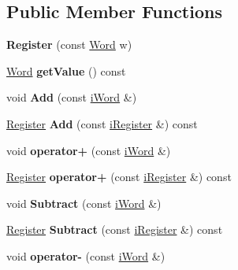 \subsection*{Public Member Functions}
\begin{DoxyCompactItemize}
\item 
\hypertarget{classRegister_a6aea43b4c4ad669073f20fbcd274b49c}{
{\bfseries Register} (const \hyperlink{classWord}{Word} w)}
\label{classRegister_a6aea43b4c4ad669073f20fbcd274b49c}

\item 
\hypertarget{classRegister_a38a40476d54b5614138d1adac61ac1b0}{
\hyperlink{classWord}{Word} {\bfseries getValue} () const }
\label{classRegister_a38a40476d54b5614138d1adac61ac1b0}

\item 
\hypertarget{classRegister_a0dd8ed2fdfff423b6f545f8ed5640416}{
void {\bfseries Add} (const \hyperlink{classiWord}{iWord} \&)}
\label{classRegister_a0dd8ed2fdfff423b6f545f8ed5640416}

\item 
\hypertarget{classRegister_ae77a60fdd812c0c714079d23f6413e32}{
\hyperlink{classRegister}{Register} {\bfseries Add} (const \hyperlink{classiRegister}{iRegister} \&) const }
\label{classRegister_ae77a60fdd812c0c714079d23f6413e32}

\item 
\hypertarget{classRegister_abc659fbe3ff01c1699397e955b855538}{
void {\bfseries operator+} (const \hyperlink{classiWord}{iWord} \&)}
\label{classRegister_abc659fbe3ff01c1699397e955b855538}

\item 
\hypertarget{classRegister_ab7a09bc613dd8ce801c411d875502e4b}{
\hyperlink{classRegister}{Register} {\bfseries operator+} (const \hyperlink{classiRegister}{iRegister} \&) const }
\label{classRegister_ab7a09bc613dd8ce801c411d875502e4b}

\item 
\hypertarget{classRegister_a1d7b39b6a279700bc30dd6b303c508f9}{
void {\bfseries Subtract} (const \hyperlink{classiWord}{iWord} \&)}
\label{classRegister_a1d7b39b6a279700bc30dd6b303c508f9}

\item 
\hypertarget{classRegister_a75cf10d9af24894693a5ce02e97cf705}{
\hyperlink{classRegister}{Register} {\bfseries Subtract} (const \hyperlink{classiRegister}{iRegister} \&) const }
\label{classRegister_a75cf10d9af24894693a5ce02e97cf705}

\item 
\hypertarget{classRegister_ae80c5acbf654037c0677a6dec824501c}{
void {\bfseries operator-\/} (const \hyperlink{classiWord}{iWord} \&)}
\label{classRegister_ae80c5acbf654037c0677a6dec824501c}


\end{DoxyCompactItemize}
